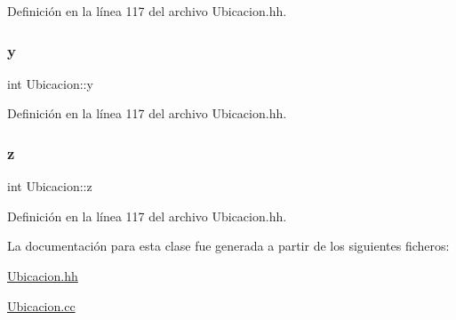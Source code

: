 Definición en la línea 117 del archivo Ubicacion.\+hh.

\mbox{\label{class_ubicacion_ab314f05b8da651aabb8a623467919a94}} 
\subsubsection{\texorpdfstring{y}{y}}
{\footnotesize\ttfamily int Ubicacion\+::y\hspace{0.3cm}{\ttfamily [private]}}



Definición en la línea 117 del archivo Ubicacion.\+hh.

\mbox{\label{class_ubicacion_ad74770f35bf4b18d3959b78cd90b6eb0}} 
\subsubsection{\texorpdfstring{z}{z}}
{\footnotesize\ttfamily int Ubicacion\+::z\hspace{0.3cm}{\ttfamily [private]}}



Definición en la línea 117 del archivo Ubicacion.\+hh.



La documentación para esta clase fue generada a partir de los siguientes ficheros\+:\begin{DoxyCompactItemize}
\item 
\hyperlink{_ubicacion_8hh}{Ubicacion.\+hh}\item 
\hyperlink{_ubicacion_8cc}{Ubicacion.\+cc}\end{DoxyCompactItemize}
